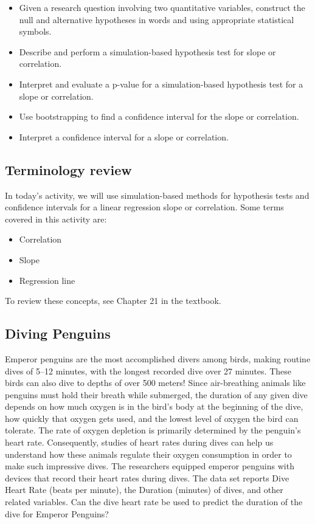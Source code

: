 \documentclass[
]{report}
\begin{document}
\begin{itemize}
\item
  Given a research question involving two quantitative variables, construct the null and alternative hypotheses
  in words and using appropriate statistical symbols.
\item
  Describe and perform a simulation-based hypothesis test for slope or correlation.
\item
  Interpret and evaluate a p-value for a simulation-based hypothesis test for a slope or correlation.
\item
  Use bootstrapping to find a confidence interval for the slope or correlation.
\item
  Interpret a confidence interval for a slope or correlation.
\end{itemize}

\hypertarget{terminology-review-21}{%
\subsection{Terminology review}\label{terminology-review-21}}

In today's activity, we will use simulation-based methods for hypothesis tests and confidence intervals for a linear regression slope or correlation. Some terms covered in this activity are:

\begin{itemize}
\item
  Correlation
\item
  Slope
\item
  Regression line
\end{itemize}

To review these concepts, see Chapter 21 in the textbook.

\hypertarget{diving-penguins}{%
\subsection{Diving Penguins}\label{diving-penguins}}

Emperor penguins are the most accomplished divers among birds, making routine dives of 5--12 minutes, with the longest recorded dive over 27 minutes. These birds can also dive to depths of over 500 meters! Since air-breathing animals like penguins must hold their breath while submerged, the duration of any given dive depends on how much oxygen is in the bird's body at the beginning of the dive, how quickly that oxygen gets used, and the lowest level of oxygen the bird can tolerate. The rate of oxygen depletion is primarily determined by the penguin's heart rate. Consequently, studies of heart rates during dives can help us understand how these animals regulate their oxygen consumption in order to make such impressive dives. The researchers equipped emperor penguins with devices that record their heart rates during dives. The data set reports Dive Heart Rate (beats per minute), the Duration (minutes) of dives, and other related variables. Can the dive heart rate be used to predict the duration of the dive for Emperor Penguins?
\end{document}
